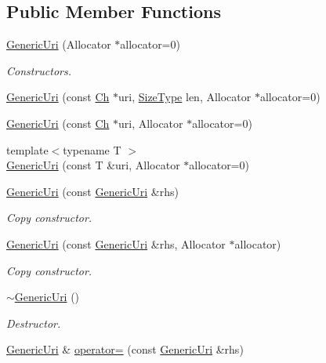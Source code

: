 \subsection*{Public Member Functions}
\begin{DoxyCompactItemize}
\item 
\hyperlink{classGenericUri_ae9e702382446e760e66e45872567b59e}{Generic\+Uri} (Allocator $\ast$allocator=0)
\begin{DoxyCompactList}\small\item\em Constructors. \end{DoxyCompactList}\item 
\hyperlink{classGenericUri_a188f7f9d11aac1c7647e6f43e05fcbd4}{Generic\+Uri} (const \hyperlink{classGenericUri_a20d0602cff62211d89bc4b25963beeee}{Ch} $\ast$uri, \hyperlink{rapidjson_8h_a5ed6e6e67250fadbd041127e6386dcb5}{Size\+Type} len, Allocator $\ast$allocator=0)
\item 
\hyperlink{classGenericUri_a2077917cd430c4893a3eee2fc5133727}{Generic\+Uri} (const \hyperlink{classGenericUri_a20d0602cff62211d89bc4b25963beeee}{Ch} $\ast$uri, Allocator $\ast$allocator=0)
\item 
{\footnotesize template$<$typename T $>$ }\\\hyperlink{classGenericUri_ae0d105ae4ae9a2edc6489835f3bf62a5}{Generic\+Uri} (const T \&uri, Allocator $\ast$allocator=0)
\item 
\hyperlink{classGenericUri_a701930adaab51f0da0b2fba64bb67b25}{Generic\+Uri} (const \hyperlink{classGenericUri}{Generic\+Uri} \&rhs)
\begin{DoxyCompactList}\small\item\em Copy constructor. \end{DoxyCompactList}\item 
\hyperlink{classGenericUri_a233ee45aeaeb5ee3a6ccea5a720d67b2}{Generic\+Uri} (const \hyperlink{classGenericUri}{Generic\+Uri} \&rhs, Allocator $\ast$allocator)
\begin{DoxyCompactList}\small\item\em Copy constructor. \end{DoxyCompactList}\item 
\hyperlink{classGenericUri_a6479d97f05ba77b27f06778ce17590d0}{$\sim$\+Generic\+Uri} ()
\begin{DoxyCompactList}\small\item\em Destructor. \end{DoxyCompactList}\item 
\hyperlink{classGenericUri}{Generic\+Uri} \& \hyperlink{classGenericUri_a0d6608816d2eb6a7846bec4ddcc293d0}{operator=} (const \hyperlink{classGenericUri}{Generic\+Uri} \&rhs)

\end{DoxyCompactItemize}
